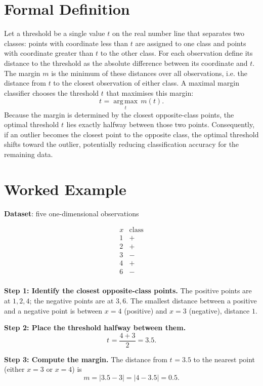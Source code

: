 \documentclass[12pt, a4paper]{article}
\providecommand{\operatorname}[1]{\mathop{\mathrm{#1}}\nolimits}
\begin{document}
\section{Formal Definition}
Let a threshold be a single value \(t\) on the real number line that separates two classes: points with coordinate less than \(t\) are assigned to one class and points with coordinate greater than \(t\) to the other class.  
For each observation define its distance to the threshold as the absolute difference between its coordinate and \(t\).  
The margin \(m\) is the minimum of these distances over all observations, i.e. the distance from \(t\) to the closest observation of either class.  
A maximal margin classifier chooses the threshold \(t^{}\) that maximises this margin:
\[
t^{} = \underset{t}{\operatorname{arg\,max}}\, m(t) .
\]
Because the margin is determined by the closest opposite-class points, the optimal threshold \(t^{}\) lies exactly halfway between those two points.  
Consequently, if an outlier becomes the closest point to the opposite class, the optimal threshold shifts toward the outlier, potentially reducing classification accuracy for the remaining data.  

\section{Worked Example}
\textbf{Dataset}: five one-dimensional observations  

\[
\begin{array}{c|c}
x & \text{class}\\ \hline
1 & +\\
2 & +\\
3 & -\\
4 & +\\
6 & -\\
\end{array}
\]

\textbf{Step 1: Identify the closest opposite-class points.}  
The positive points are at \(1,2,4\); the negative points are at \(3,6\).  
The smallest distance between a positive and a negative point is between \(x=4\) (positive) and \(x=3\) (negative), distance \(1\).

\textbf{Step 2: Place the threshold halfway between them.}  
\[
t^{}= \frac{4+3}{2}=3.5 .
\]

\textbf{Step 3: Compute the margin.}  
The distance from \(t^{}=3.5\) to the nearest point (either \(x=3\) or \(x=4\)) is
\[
m = |3.5-3| = |4-3.5| = 0.5 .
\]
\end{document}
